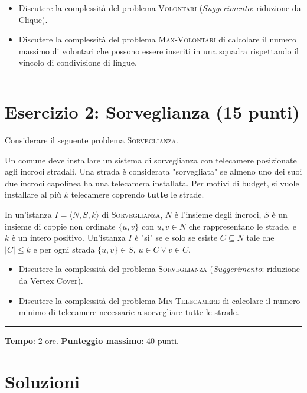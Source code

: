 \documentclass{report}
\begin{document}
\begin{itemize}
  \item Discutere la complessità del problema \textsc{Volontari} (\emph{Suggerimento}: riduzione da Clique).
  \item Discutere la complessità del problema \textsc{Max-Volontari} di calcolare il numero massimo di volontari che possono essere inseriti in una squadra rispettando il vincolo di condivisione di lingue.
\end{itemize}

\hrule

\section*{Esercizio 2: Sorveglianza (15 punti)}

Considerare il seguente problema \textsc{Sorveglianza}.

Un comune deve installare un sistema di sorveglianza con telecamere posizionate agli incroci stradali. Una strada è considerata "sorvegliata" se almeno uno dei suoi due incroci capolinea ha una telecamera installata. Per motivi di budget, si vuole installare al più $k$ telecamere coprendo \textbf{tutte} le strade.

In un'istanza $I = \langle N, S, k\rangle$ di \textsc{Sorveglianza}, $N$ è l'insieme degli incroci, $S$ è un insieme di coppie non ordinate $\{u, v\}$ con $u, v \in N$ che rappresentano le strade, e $k$ è un intero positivo. Un'istanza $I$ è "sì" se e solo se esiste $C \subseteq N$ tale che $|C| \leq k$ e per ogni strada $\{u, v\} \in S$, $u \in C \vee v \in C$.

\begin{itemize}
  \item Discutere la complessità del problema \textsc{Sorveglianza} (\emph{Suggerimento}: riduzione da Vertex Cover).
  \item Discutere la complessità del problema \textsc{Min-Telecamere} di calcolare il numero minimo di telecamere necessarie a sorvegliare tutte le strade.
\end{itemize}

\hrule

\vspace{1cm}

\textbf{Tempo}: 2 ore. \textbf{Punteggio massimo}: 40 punti.

\newpage

\section*{Soluzioni}
\end{document}
